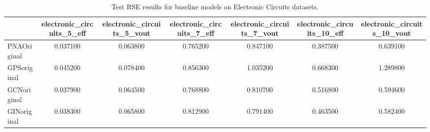 \begin{table}
\caption{Test RSE results for baseline models on Electronic Circuits datasets.}
\label{tab:baseline_results}
\begin{tabular}{lcccccc}
\toprule
 & electronic_circuits_5_eff & electronic_circuits_5_vout & electronic_circuits_7_eff & electronic_circuits_7_vout & electronic_circuits_10_eff & electronic_circuits_10_vout \\
\midrule
PNAOriginal & 0.037100 & 0.063800 & 0.765200 & 0.847100 & 0.387500 & 0.639100 \\
GPSoriginal & 0.045200 & 0.078400 & 0.856300 & 1.035200 & 0.668300 & 1.289800 \\
GCNoriginal & 0.037900 & 0.064500 & 0.768800 & 0.810700 & 0.516800 & 0.594600 \\
GINoriginal & 0.038300 & 0.065800 & 0.812900 & 0.791400 & 0.463500 & 0.582400 \\
\bottomrule
\end{tabular}
\end{table}

